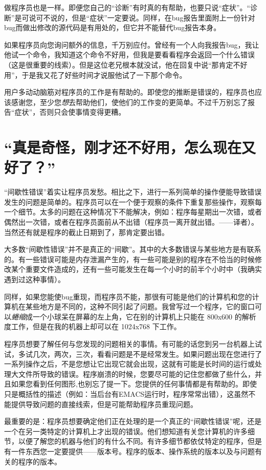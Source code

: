\documentclass[titlepage]{article}
\begin{document}
做程序员也是一样。即便您自己的“诊断”有时真的有帮助，也要只说“症状”。“诊断”是可说可不说的，但是“症状”一定要说。同样，在bug报告里面附上一份针对bug而做出修改的源代码是有用处的，但它并不能替代bug报告本身。

如果程序员向您询问额外的信息，千万别应付。曾经有一个人向我报告bug，我让他试一个命令，我知道这个命令不好用，但我是要看看程序会返回一个什么错误（这是很重要的线索）。但是这位老兄根本就没试，他在回复中说“那肯定不好用”，于是我又花了好些时间才说服他试了一下那个命令。

用户多动动脑筋对程序员的工作是有帮助的。即使您的推断是错误的，程序员也应该感谢您，至少您\emph{想}去帮助他们，使他们的工作变的更简单。不过千万别忘了报告“症状”，否则只会使事情变得更糟。

\section{{“真是奇怪，刚才还不好用，怎么现在又好了？”}}

“间歇性错误”着实让程序员发愁。相比之下，进行一系列简单的操作便能导致错误发生的问题是简单的。程序员可以在一个便于观察的条件下重复那些操作，观察每一个细节。太多的问题在这种情况下不能解决，例如：程序每星期出一次错，或者偶然出一次错，或者在程序员面前从不出错（程序员一离开就出错。——译者）。当然还有就是程序的截止日期到了，那肯定要出错。

大多数“间歇性错误”并不是真正的“间歇”。其中的大多数错误与某些地方是有联系的。有一些错误可能是内存泄漏产生的，有一些可能是别的程序在不恰当的时候修改某个重要文件造成的，还有一些可能发生在每一个小时的前半个小时中（我确实遇到过这种事情）。

同样，如果您能使bug重现，而程序员不能，那很有可能是他们的计算机和您的计算机在某些地方是不同的，这种不同引起了问题。我曾写过一个程序，它的窗口可以\emph{蜷缩}成一个小球呆在屏幕的左上角，它在别的计算机上只能在 800x600 的解析度工作，但是在我的机器上却可以在 1024x768 下工作。

程序员想要了解任何与您发现的问题相关的事情。有可能的话您到另一台机器上试试，多试几次，两次，三次，看看问题是不是经常发生。如果问题出现在您进行了一系列操作之后，不是您想让它出现它就会出现，这就有可能是长时间的运行或处理大文件所导致的错误。程序崩溃的时候，您要尽可能的记住您都做了些什么，并且如果您看到任何图形,也别忘了提一下。您提供的任何事情都是有帮助的。即使只是概括性的描述（例如：当后台有EMACS运行时，程序常常出错），这虽然不能提供导致问题的直接线索，但是可能帮助程序员重现问题。

最重要的是：程序员想要确定他们正在处理的是一个真正的“间歇性错误”呢，还是一个在另一类特定的计算机上才出现的错误。他们想知道有关您计算机的许多细节，以便了解您的机器与他们的有什么不同。有许多细节都依仗特定的程序，但是有一件东西您一定要提供——版本号。程序的版本、操作系统的版本以及与问题有关的程序的版本。
\end{document}
